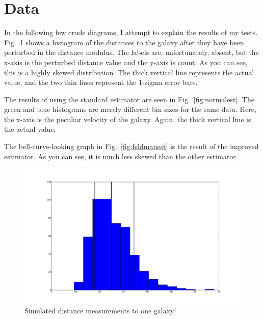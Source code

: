 \documentclass[usenatbib]{mn2e}
\begin{document}
\section{Data}
In the following few crude diagrams, I attempt to explain the results of my tests. Fig.~\ref{fig:distances} shows a histogram of the distances to the galaxy after they have been perturbed in the distance modulus. The labels are, unfortunately, absent, but the x-axis is the perturbed distance value and the y-axis is count. As you can see, this is a highly skewed distribution. The thick vertical line represents the actual value, and the two thin lines represent the 1-sigma error bars.

The results of using the standard estimator are seen in Fig.~\ref{fig:normalest}. The green and blue histograms are merely different bin sizes for the same data. Here, the x-axis is the peculiar velocity of the galaxy. Again, the thick vertical line is the actual value.

The bell-curve-looking graph in Fig.~\ref{fig:feldmanest} is the result of the improved estimator. As you can see, it is much less skewed than the other estimator.

\begin{figure}
  \begin{center}
  \includegraphics[scale=0.2]{11-23.pdf}
  \end{center}
\caption{\small
Simulated distance measurements to one galaxy!
}
\label{fig:distances}
\end{figure}
\end{document}
